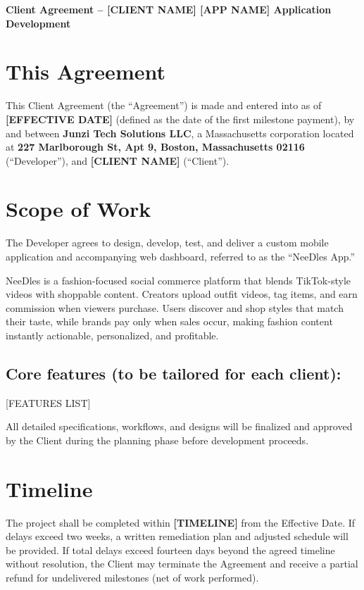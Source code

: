 \documentclass[11pt,letterpaper]{article}
\newcommand{\ClientName}{[CLIENT NAME]}
\newcommand{\AppName}{[APP NAME]}
\newcommand{\EffectiveDate}{[EFFECTIVE DATE]}
\newcommand{\TimeLine}{[TIMELINE]}
\newcommand{\FeaturesListPlaceholder}{[FEATURES LIST]}
\begin{document}
\begin{center}
\Large\textbf{Client Agreement -- \ClientName{} \AppName{} Application Development}
\end{center}

\vspace{1em}

\section*{This Agreement}
This Client Agreement (the ``Agreement'') is made and entered into as of \textbf{\EffectiveDate{}} (defined as the date of the first milestone payment), by and between \textbf{Junzi Tech Solutions LLC}, a Massachusetts corporation located at \textbf{227 Marlborough St, Apt 9, Boston, Massachusetts 02116} (``Developer''), and \textbf{\ClientName{}} (``Client'').

\section{Scope of Work}
The Developer agrees to design, develop, test, and deliver a custom mobile application and accompanying web dashboard, referred to as the ``NeeDles App.''

NeeDles is a fashion-focused social commerce platform that blends TikTok-style videos with shoppable content. Creators upload outfit videos, tag items, and earn commission when viewers purchase. Users discover and shop styles that match their taste, while brands pay only when sales occur, making fashion content instantly actionable, personalized, and profitable.

\subsection*{Core features (to be tailored for each client):}
\FeaturesListPlaceholder{}

All detailed specifications, workflows, and designs will be finalized and approved by the Client during the planning phase before development proceeds.

\section{Timeline}
The project shall be completed within \textbf{\TimeLine{}} from the Effective Date. If delays exceed two weeks, a written remediation plan and adjusted schedule will be provided. If total delays exceed fourteen days beyond the agreed timeline without resolution, the Client may terminate the Agreement and receive a partial refund for undelivered milestones (net of work performed).
\end{document}
